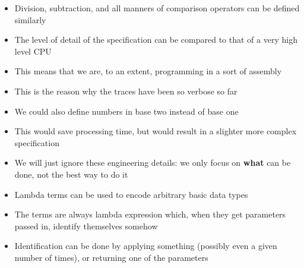 \documentclass{beamer}
\begin{document}
\begin{frame}[fragile]{\CurrentSection}
\begin{block}{\CurrentSubSection}
\begin{itemize}
\item Division, subtraction, and all manners of comparison operators can be defined similarly
\item The level of detail of the specification can be compared to that of a very high level CPU
\item This means that we are, to an extent, programming in a sort of assembly
\item This is the reason why the traces have been so verbose so far

\end{itemize}

\end{block}


\end{frame}

\begin{frame}[fragile]{\CurrentSection}
\begin{block}{\CurrentSubSection}
\begin{itemize}
\item We could also define numbers in base two instead of base one
\item This would save processing time, but would result in a slighter more complex specification
\item We will just ignore these engineering details: we only focus on \textbf{what} can be done, not the best way to do it

\end{itemize}

\end{block}


\end{frame}

\begin{frame}[fragile]{\CurrentSection}
\begin{block}{\CurrentSubSection}
\begin{itemize}
\item Lambda terms can be used to encode arbitrary basic data types
\item The terms are always lambda expression which, when they get parameters passed in, identify themselves somehow
\item Identification can be done by applying something (possibly even a given number of times), or returning one of the parameters

\end{itemize}

\end{block}


\end{frame}
\end{document}
